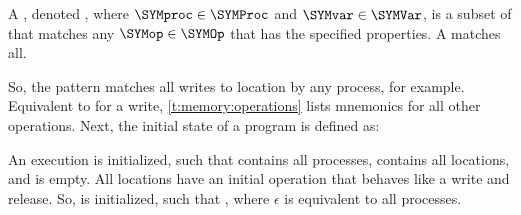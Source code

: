 
\begin{definition}[Pattern]
	A , denoted , where \mbox{$\SYMproc\in\SYMProc$} and \mbox{$\SYMvar\in\SYMVar$}, is a subset of \SYMOp that matches any \mbox{$\SYMop\in\SYMOp$} that has the specified properties.
	A \SYMany matches all.
\end{definition}
So, the pattern \memoppattern{\SYMopwrite}{}{\SYMvar}{} matches all writes to location \SYMvar by any process, for example.
Equivalent to \SYMopwrite for a write, \cref{t:memory:operations} lists mnemonics for all other operations.
Next, the initial state of a program is defined as:
\begin{definition}[Initialization]
	An execution \SYMExecdef is initialized, such that \SYMProc contains all processes, \SYMVar contains all locations, and \SYMOrder is empty.
	All locations have an initial operation that behaves like a write and release.
	So, \SYMOp is initialized, such that \SYMOpinit, where $\epsilon$ is equivalent to all processes.
	\label{def:memory:init}
\end{definition}

